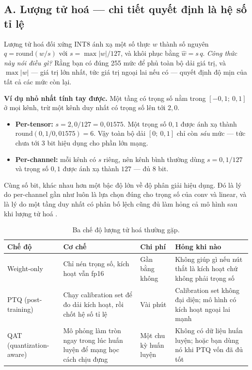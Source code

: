 \documentclass[../../deep_learning.tex]{subfiles}
\begin{document}
\subsection{A. Lượng tử hoá --- chi tiết quyết định là hệ số tỉ lệ}
Lượng tử hoá đối xứng INT8 ánh xạ một số thực $w$ thành số nguyên $q = \mathrm{round}(w/s)$ với $s = \max|w|/127$, và khôi phục bằng $\hat{w} = s\,q$. \emph{Công thức này nói điều gì?} Rằng bạn có đúng 255 mức để phủ toàn bộ dải giá trị, và $\max|w|$ --- giá trị lớn nhất, tức giá trị ngoại lai nếu có --- quyết định độ mịn của tất cả các mức còn lại.

\textbf{Ví dụ nhỏ nhất tính tay được.} Một tầng có trọng số nằm trong $[-0{,}1;\ 0{,}1]$ ở mọi kênh, trừ một kênh duy nhất có trọng số lên tới $2{,}0$.

\begin{itemize}
\item \textbf{Per-tensor:} $s = 2{,}0/127 = 0{,}01575$. Một trọng số $0{,}1$ được ánh xạ thành $\mathrm{round}(0{,}1/0{,}01575) = 6$. Vậy toàn bộ dải $[0;\ 0{,}1]$ chỉ còn \emph{sáu} mức --- tức chưa tới 3 bit hiệu dụng cho phần lớn mạng.
\item \textbf{Per-channel:} mỗi kênh có $s$ riêng, nên kênh bình thường dùng $s = 0{,}1/127$ và trọng số $0{,}1$ được ánh xạ thành $127$ --- đủ 8 bit.
\end{itemize}

Cùng số bit, khác nhau hơn một bậc độ lớn về độ phân giải hiệu dụng. Đó là lý do per-channel gần như luôn là lựa chọn đúng cho trọng số của conv và linear, và là lý do một tầng duy nhất có phân bố lệch cũng đủ làm hỏng cả mô hình sau khi lượng tử hoá \cite{nagel2021whitepaper,jacob2018quantization}.

\begin{table}[H]\centering\footnotesize
\caption{Ba chế độ lượng tử hoá thường gặp.}
\label{tab:ptq-qat}
\begin{tabularx}{\linewidth}{@{}L{2.5cm}YYY@{}}
\toprule
\textbf{Chế độ} & \textbf{Cơ chế} & \textbf{Chi phí} & \textbf{Hỏng khi nào}\\
\midrule
Weight-only & Chỉ nén trọng số, kích hoạt vẫn fp16 & Gần bằng không & Không giúp gì nếu nút thắt là kích hoạt chứ không phải trọng số\\
PTQ (post-training) & Chạy calibration set để đo dải kích hoạt, rồi chốt hệ số tỉ lệ & Vài phút & Calibration set không đại diện; mô hình có kích hoạt ngoại lai mạnh\\
QAT (quantization-aware) & Mô phỏng làm tròn ngay trong lúc huấn luyện để mạng học cách chịu đựng & Một chu kỳ huấn luyện & Không có dữ liệu huấn luyện; hoặc bạn dùng nó khi PTQ vốn đã đủ tốt\\
\bottomrule
\end{tabularx}
\end{table}
\end{document}
